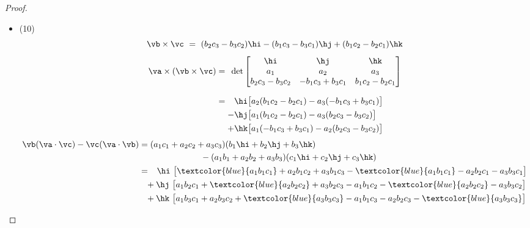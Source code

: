 \begin{proof}
\begin{itemize}
\begin{align*}
&=c_1\det\left[\begin{matrix}
a_2&a_3\\
b_2&b_3\end{matrix}\right]
-c_2\det\left[\begin{matrix}
a_1&a_3\\
b_1&b_3\end{matrix}\right]
+c_3\det\left[\begin{matrix}
a_1&a_2\\
b_1&b_2\end{matrix}\right]\\
&=\det\left[\begin{matrix}c_1&c_2&c_3\cr a_1&a_2&a_3\\
b_1&b_2&b_3\\
\end{matrix}\right]
\end{align*}
\item (10)
\begin{equation*}
\vb\times\vc\ =\ (b_2c_3-b_3c_2)\hi-(b_1c_3-b_3c_1)\hj + (b_1c_2-b_2c_1)\hk
\end{equation*}
\begin{align*}
\va\times(\vb\times\vc)
=\phantom{-}&\!\!\!\det\left[\begin{matrix}\hi&\hj &\hk\\
a_1&a_2&a_3\\
b_2c_3-b_3c_2&-b_1c_3+b_3c_1&b_1c_2-b_2c_1
\end{matrix}\right]\\[0.1in]
=\phantom{-}&\hi\big[a_2(b_1c_2-b_2c_1)-a_3(-b_1c_3+b_3c_1)\big]\\
-&\hj\big[a_1(b_1c_2-b_2c_1)-a_3(b_2c_3-b_3c_2)\big]\\
+&\hk\big[a_1(-b_1c_3+b_3c_1)-a_2(b_2c_3-b_3c_2)\big]
\end{align*}
\begin{align*}
\vb(\va\cdot\vc) - \vc(\va\cdot\vb)
&=(a_1c_1+a_2c_2+a_3c_3)(b_1\hi+b_2\hj+b_3\hk) \\
&\hskip1in -(a_1b_1+a_2b_2+a_3b_3)(c_1\hi+c_2\hj+c_3\hk)
\\
&=\phantom{-}
\hi\ \big[\textcolor{blue}{a_1b_1c_1}
+a_2b_1c_2+a_3b_1c_3-
\textcolor{blue}{a_1b_1c_1}
-a_2b_2c_1-a_3b_3c_1\big]
\\
&\phantom{=}+\hj\ \big[a_1b_2c_1
+\textcolor{blue}{a_2b_2c_2}
+a_3b_2c_3-a_1b_1c_2
-\textcolor{blue}{a_2b_2c_2}
-a_3b_3c_2\big]
\\
&\phantom{=}+\hk\ \big[a_1b_3c_1+a_2b_3c_2
+\textcolor{blue}{a_3b_3c_3}
-a_1b_1c_3-a_2b_2c_3
-\textcolor{blue}{a_3b_3c_3}\big]

\end{align*}
\end{itemize}
\end{proof}
